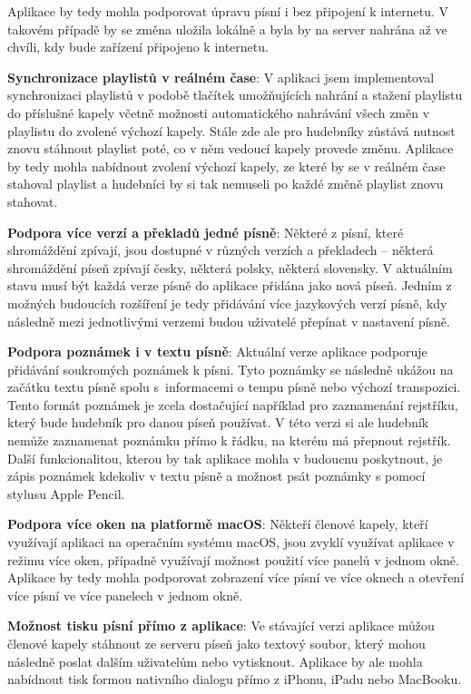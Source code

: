 Aplikace by tedy mohla podporovat úpravu písní i bez připojení k internetu. V takovém případě by se změna uložila lokálně a byla by na server nahrána až ve chvíli, kdy bude zařízení připojeno k internetu.

\textbf{Synchronizace playlistů v reálném čase}: V aplikaci jsem implementoval synchronizaci playlistů v podobě tlačítek umožňujících nahrání a stažení playlistu do příslušné kapely včetně možnosti automatického nahrávání všech změn v playlistu do zvolené výchozí kapely. Stále zde ale pro hudebníky zůstává nutnost znovu stáhnout playlist poté, co v něm vedoucí kapely provede změnu. Aplikace by tedy mohla nabídnout zvolení výchozí kapely, ze které by se v reálném čase stahoval playlist a hudebníci by si tak nemuseli po každé změně playlist znovu stahovat.

\textbf{Podpora více verzí a překladů jedné písně}: Některé z písní, které shromáždění zpívají, jsou dostupné v různých verzích a překladech -- některá shromáždění píseň zpívají česky, některá polsky, některá slovensky. V aktuálním stavu musí být každá verze písně do aplikace přidána jako nová píseň. Jedním z možných budoucích rozšíření je tedy přidávání více jazykových verzí písně, kdy následně mezi jednotlivými verzemi budou uživatelé přepínat v nastavení písně.

\textbf{Podpora poznámek i v textu písně}: Aktuální verze aplikace podporuje přidávání soukromých poznámek k písni. Tyto poznámky se následně ukážou na začátku textu písně spolu s~informacemi o tempu písně nebo výchozí transpozici. Tento formát poznámek je zcela dostačující například pro zaznamenání rejstříku, který bude hudebník pro danou píseň používat. V této verzi si ale hudebník nemůže zaznamenat poznámku přímo k řádku, na kterém má přepnout rejstřík. Další funkcionalitou, kterou by tak aplikace mohla v budoucnu poskytnout, je zápis poznámek kdekoliv v textu písně a možnost psát poznámky s pomocí stylusu Apple Pencil.

\textbf{Podpora více oken na platformě macOS}: Někteří členové kapely, kteří využívají aplikaci na operačním systému macOS, jsou zvyklí využívat aplikace v režimu více oken, případně využívají možnost použití více panelů v jednom okně. Aplikace by tedy mohla podporovat zobrazení více písní ve více oknech a otevření více písní ve více panelech v jednom okně.

\textbf{Možnost tisku písní přímo z aplikace}: Ve stávající verzi aplikace můžou členové kapely stáhnout ze serveru píseň jako textový soubor, který mohou následně poslat dalším uživatelům nebo vytisknout. Aplikace by ale mohla nabídnout tisk formou nativního dialogu přímo z iPhonu, iPadu nebo MacBooku.

